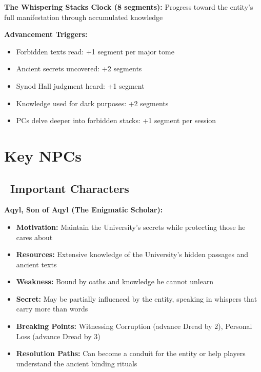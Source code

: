 \documentclass[11pt]{article}
\begin{document}
\textbf{The Whispering Stacks Clock (8 segments):}
Progress toward the entity's full manifestation through accumulated knowledge

\textbf{Advancement Triggers:}
\begin{itemize}
    \item Forbidden texts read: +1 segment per major tome
    \item Ancient secrets uncovered: +2 segments
    \item Synod Hall judgment heard: +1 segment
    \item Knowledge used for dark purposes: +2 segments
    \item PCs delve deeper into forbidden stacks: +1 segment per session
\end{itemize}

\section{Key NPCs}

\subsection*{\faUsers\ Important Characters}

\textbf{Aqyl, Son of Aqyl (The Enigmatic Scholar):}
\begin{itemize}
    \item \textbf{Motivation:} Maintain the University's secrets while protecting those he cares about
    \item \textbf{Resources:} Extensive knowledge of the University's hidden passages and ancient texts
    \item \textbf{Weakness:} Bound by oaths and knowledge he cannot unlearn
    \item \textbf{Secret:} May be partially influenced by the entity, speaking in whispers that carry more than words
    \item \textbf{Breaking Points:} Witnessing Corruption (advance Dread by 2), Personal Loss (advance Dread by 3)
    \item \textbf{Resolution Paths:} Can become a conduit for the entity or help players understand the ancient binding rituals
\end{itemize}
\end{document}
